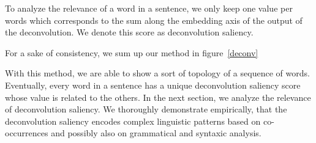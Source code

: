 To analyze the relevance of a word in a sentence, we only keep one value per words which corresponds to the sum along the embedding axis of the output of the deconvolution. We denote this score as deconvolution saliency.

For a sake of consistency, we sum up our method in figure~\ref{deconv}

With this method, we are able to show a sort of topology of a sequence of words. 
Eventually, every word in a sentence has a unique deconvolution saliency score whose value is related to the others. 
In the next section, we analyze the relevance of deconvolution saliency. We thoroughly demonstrate empirically, that the deconvolution saliency encodes 
complex linguistic patterns based on co-occurrences and possibly also on grammatical and syntaxic analysis.
